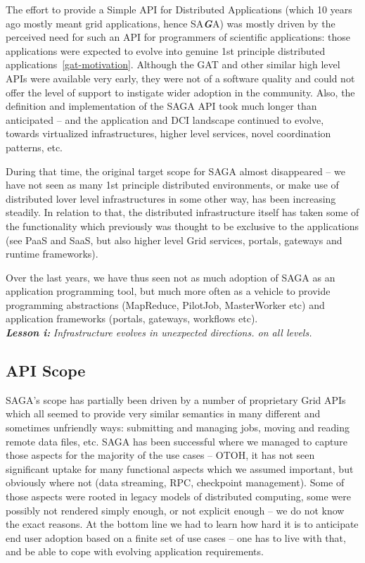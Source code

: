 \documentclass[]{article}
\newcommand{\I}[1]{\textit{#1}}
\newcommand{\BI}[1]{\textbf{\textit{#1}}}
\begin{document}
  The effort to provide a Simple API for Distributed Applications
  (which 10 years ago mostly meant grid applications, hence SA\BI{G}A)
  was mostly driven by the perceived need for such an API for
  programmers of scientific applications: those applications were
  expected to evolve into genuine 1st principle distributed
  applications~\ref{gat-motivation}.  Although the GAT and other
  similar high level APIs were available very early, they were not of
  a software quality and could not offer the level of support to
  instigate wider adoption in the community.  Also, the definition and
  implementation of the SAGA API took much longer than anticipated --
  and the application and DCI landscape continued to evolve, towards
  virtualized infrastructures, higher level services, novel
  coordination patterns, etc.
  
  During that time, the original target scope for SAGA almost
  disappeared -- we have not seen as many 1st principle distributed
  environments, or make use of distributed lover level infrastructures
  in some other way, has been increasing steadily.  In relation to
  that, the distributed infrastructure itself has taken some of the
  functionality which previously was thought to be exclusive to the
  applications (see PaaS and SaaS, but also higher level Grid
  services, portals, gateways and runtime frameworks).

  Over the last years, we have thus seen not as much adoption of SAGA
  as an application programming tool, but much more often as a vehicle
  to provide programming abstractions (MapReduce, PilotJob,
  MasterWorker etc) and application frameworks (portals, gateways,
  workflows etc).\\
  \BI{Lesson i:} \I{Infrastructure evolves in unexpected directions.
  on all levels.}


 \subsection{API Scope}

  SAGA's scope has partially been driven by a number of proprietary
  Grid APIs which all seemed to provide very similar semantics in many
  different and sometimes unfriendly ways: submitting and managing
  jobs, moving and reading remote data files, etc.  SAGA has been
  successful where we managed to capture those aspects for the
  majority of the use cases -- OTOH, it has not seen significant
  uptake for many functional aspects which we assumed important, but
  obviously where not (data streaming, RPC, checkpoint management).
  Some of those aspects were rooted in legacy models of distributed
  computing, some were possibly not rendered simply enough, or not
  explicit enough -- we do not know the exact reasons.  At the bottom
  line we had to learn how hard it is to anticipate end user adoption
  based on a finite set of use cases -- one has to live with that, and
  be able to cope with evolving application requirements.
\end{document}
